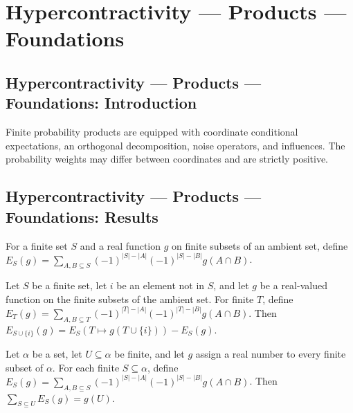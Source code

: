 \section{Hypercontractivity --- Products --- Foundations}
\subsection*{Hypercontractivity --- Products --- Foundations: Introduction}
Finite probability products are equipped with coordinate conditional expectations, an orthogonal decomposition, noise operators, and influences. The probability weights may differ between coordinates and are strictly positive.

\subsection*{Hypercontractivity --- Products --- Foundations: Results}

\begin{definition}
\leanok
For a finite set $S$ and a real function $g$ on finite subsets of an ambient set, define $E_S(g)=\sum_{A,B\subseteq S}(-1)^{|S|-|A|}(-1)^{|S|-|B|}g(A\cap B)$.
\end{definition}

\begin{theorem}
\leanok
{}
Let $S$ be a finite set, let $i$ be an element not in $S$, and let $g$ be a real-valued
function on the finite subsets of the ambient set. For finite $T$, define
$E_T(g)=\sum_{A,B\subseteq T}(-1)^{|T|-|A|}(-1)^{|T|-|B|}g(A\cap B)$. Then
$E_{S\cup\{i\}}(g)=E_S(T\mapsto g(T\cup\{i\}))-E_S(g)$.
\end{theorem}

\begin{theorem}
\leanok
{}
Let $\alpha$ be a set, let $U\subseteq\alpha$ be finite, and let $g$ assign a real
number to every finite subset of $\alpha$. For each finite $S\subseteq\alpha$, define
$E_S(g)=\sum_{A,B\subseteq S}(-1)^{|S|-|A|}(-1)^{|S|-|B|}g(A\cap B)$. Then
$\sum_{S\subseteq U}E_S(g)=g(U)$.
\end{theorem}

